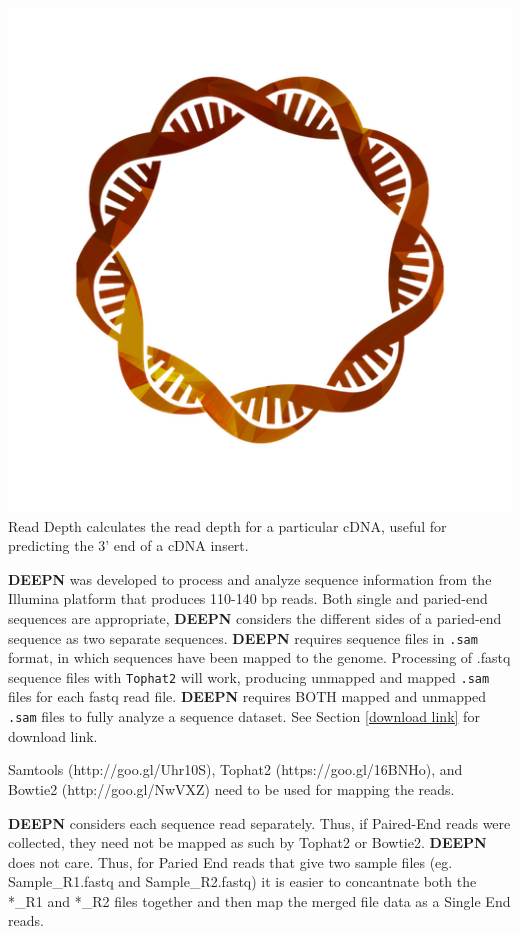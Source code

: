 \documentclass[11pt,fleqn]{book} %
\newcommand{\ReadDepth}{{\color{Bittersweet} Read Depth }}
\newcommand{\DEEPN}{\textbf{DEEPN }}
\begin{document}
\includegraphics[scale=0.3]{Pictures/read_depth.png} \ReadDepth calculates the read depth for a particular cDNA, useful for \\predicting the 3’ end of a cDNA insert.

\vspace{15pt}

\DEEPN was developed to process and analyze sequence information from the Illumina platform that produces 110-140 bp reads.  Both single and paried-end sequences are appropriate, \DEEPN considers the different sides of a paried-end sequence as two separate sequences. \DEEPN requires sequence files in \texttt{.sam} format, in which sequences have been mapped to the genome.  Processing of .fastq sequence files with \texttt{Tophat2} will work, producing unmapped and mapped \texttt{.sam} files for each fastq read file. \DEEPN requires BOTH mapped and unmapped \texttt{.sam} files to fully analyze a sequence dataset. See Section \ref{download link} for download link.

    Samtools (http://goo.gl/Uhr10S), Tophat2 (https://goo.gl/16BNHo), and Bowtie2 (http://goo.gl/NwVXZ) need to be used for mapping the reads.

    \DEEPN considers each sequence read separately. Thus, if Paired-End reads were collected, they need not be mapped as such by Tophat2 or Bowtie2.  \DEEPN does not care.  Thus, for Paried End reads that give two sample files (eg. Sample\_R1.fastq and Sample\_R2.fastq) it is easier to concantnate both the *\_R1 and *\_R2 files together and then map the merged file data as a Single End reads.
\end{document}
